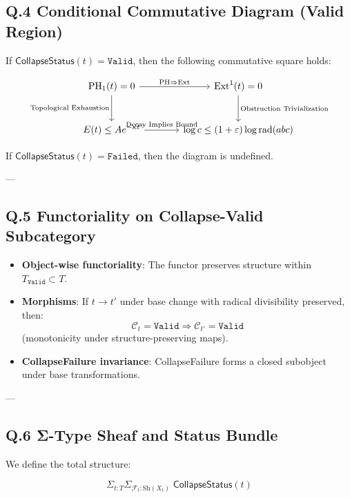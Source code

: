 \documentclass[11pt]{article}
\DeclareMathOperator{\Ext}{Ext}
\DeclareMathOperator{\PH}{PH}
\begin{document}
\subsection*{Q.4 Conditional Commutative Diagram (Valid Region)}

If \( \mathsf{CollapseStatus}(t) = \texttt{Valid} \), then the following commutative square holds:

\[
\begin{tikzcd}[row sep=large, column sep=large]
\PH_1(t) = 0 \arrow[r, "\text{PH} \Rightarrow \Ext"] \arrow[d, swap, "\text{Topological Exhaustion}"]
& \Ext^1(t) = 0 \arrow[d, "\text{Obstruction Trivialization}"] \\
E(t) \leq Ae^{-\kappa t} \arrow[r, "\text{Decay Implies Bound}"]
& \log c \leq (1+\varepsilon)\log \mathrm{rad}(abc)
\end{tikzcd}
\]

If \( \mathsf{CollapseStatus}(t) = \texttt{Failed} \), then the diagram is undefined.

---

\subsection*{Q.5 Functoriality on Collapse-Valid Subcategory}

\begin{itemize}
  \item \textbf{Object-wise functoriality}: The functor preserves structure within \( T_{\texttt{Valid}} \subset T \).
  \item \textbf{Morphisms}: If \( t \to t' \) under base change with radical divisibility preserved,  
  then:
  \[
  \mathcal{C}_{t} = \texttt{Valid} \Rightarrow \mathcal{C}_{t'} = \texttt{Valid}
  \]
  (monotonicity under structure-preserving maps).
  \item \textbf{CollapseFailure invariance}: CollapseFailure forms a closed subobject under base transformations.
\end{itemize}

---

\subsection*{Q.6 Σ-Type Sheaf and Status Bundle}

We define the total structure:

\[
\Sigma_{t:T} \Sigma_{\mathcal{F}_t:\mathrm{Sh}(X_t)} \;
  \mathsf{CollapseStatus}(t)
\]
\end{document}
